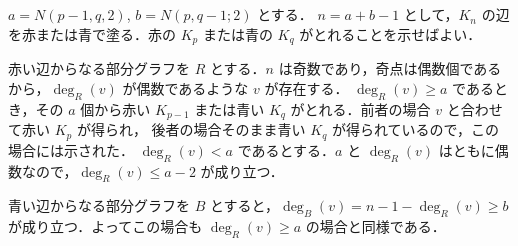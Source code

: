 \subsection{}
$a = N(p-1,q,2)$, $b = N(p,q-1;2)$ とする．
$n = a+b-1$ として，$K_n$ の辺を赤または青で塗る．赤の $K_p$ または青の $K_q$ がとれることを示せばよい．

赤い辺からなる部分グラフを $R$ とする．$n$ は奇数であり，奇点は偶数個であるから，$\deg_R(v)$ が偶数であるような $v$ が存在する．
$\deg_R(v) \geq a$ であるとき，その $a$ 個から赤い $K_{p-1}$ または青い $K_{q}$ がとれる．前者の場合 $v$ と合わせて赤い $K_p$ が得られ，
後者の場合そのまま青い $K_q$ が得られているので，この場合には示された．
$\deg_R(v) < a$ であるとする．$a$ と $\deg_R(v)$ はともに偶数なので，$\deg_R(v) \leq a-2$ が成り立つ．

青い辺からなる部分グラフを $B$ とすると，$\deg_B(v) = n - 1 - \deg_R(v) \geq b$ が成り立つ．よってこの場合も $\deg_R(v) \geq	a$ の場合と同様である．
